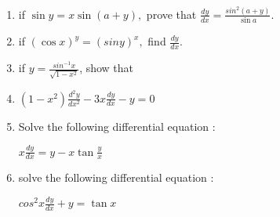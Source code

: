 \begin{enumerate}
    \item if $\sin y = x \sin(a + y),$ prove that $\frac{dy}{dx} = \frac{sin^2(a+y)}{\sin a}.$
    \item if $(\cos x)^y = (sin y)^x, $ find $\frac{dy}{dx}.$
    \item if $y = \frac{sin^{-1} x}{\sqrt{1-x^2}}$, show that
    \item $(1 - x^2)\frac{d^2{y}}{dx^2}-3x\frac{dy}{dx} - y = 0$
    \item Solve the following differential equation :
    
    \hspace{20pt} $x \frac{dy}{dx} = y - x \tan \frac{y}{x}$

    \item solve the following differential equation :

    \hspace{20pt} ${cos^{2}} {x} \frac{dy}{dx} + y = \tan x$


    
\end{enumerate}


